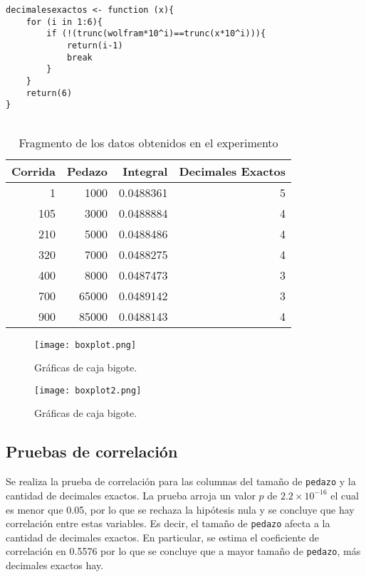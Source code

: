 \documentclass[12pt,letterpaper]{article}
\begin{document}
\begin{lstlisting}[label=lst:gc1,caption=Función \texttt{decimalesexactos}., frame = single]
decimalesexactos <- function (x){
    for (i in 1:6){
        if (!(trunc(wolfram*10^i)==trunc(x*10^i))){
            return(i-1)
            break
        } 
    }
    return(6)
}
    
\end{lstlisting} 

\begin{table}
\centering
\caption{Fragmento de los datos obtenidos en el experimento}
\begin{tabular}{rrrr}
  \hline
 Corrida & Pedazo & Integral & Decimales Exactos \\ 
  \hline
1 & 1000 & 0.0488361 & 5 \\ 
  105 & 3000 & 0.0488884 & 4 \\ 
  210 & 5000 & 0.0488486 & 4 \\ 
  320 & 7000 & 0.0488275 & 4 \\ 
  400 & 8000 & 0.0487473 & 3 \\ 
  700 & 65000 & 0.0489142 & 3 \\ 
  900 & 85000 & 0.0488143 & 4 \\ 
   \hline
\end{tabular}
\label{datos}
\end{table}
 
\begin{figure}
	\centering
	\texttt{[image: boxplot.png]}
	\caption{Gráficas de caja bigote.}
	\label{box1}
\end{figure}

\begin{figure}
	\centering
	\texttt{[image: boxplot2.png]}
	\caption{Gráficas de caja bigote.}
	\label{box2}
\end{figure}
\subsection{Pruebas de correlación}
Se realiza la prueba de correlación para las columnas del tamaño de \texttt{pedazo} y la cantidad de decimales exactos. La prueba arroja un valor $p$ de $2.2\times 10^{-16}$ el cual es menor que 0.05, por lo que se rechaza la hipótesis nula y se concluye que hay correlación entre estas variables. Es decir, el tamaño de \texttt{pedazo} afecta a la cantidad de decimales exactos. En particular, se estima el coeficiente de correlación en 0.5576 por lo que se concluye que a mayor tamaño de \texttt{pedazo}, más decimales exactos hay.
\end{document}
